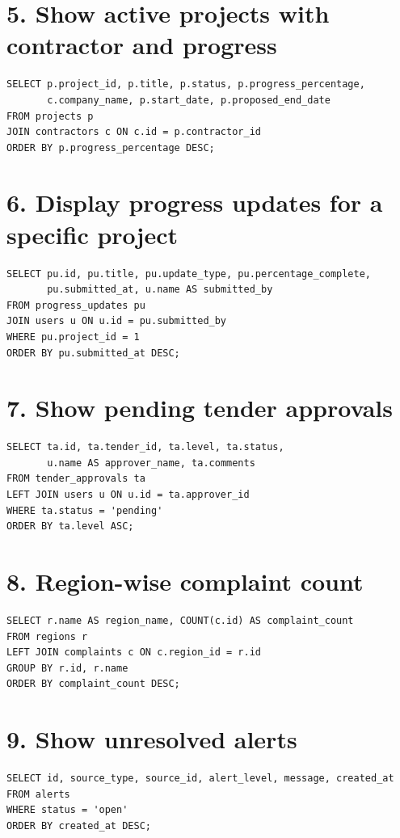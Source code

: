 \documentclass[12pt,a4paper,oneside,openany]{report}
\begin{document}
\section*{5. Show active projects with contractor and progress}
\begin{lstlisting}
SELECT p.project_id, p.title, p.status, p.progress_percentage,
       c.company_name, p.start_date, p.proposed_end_date
FROM projects p
JOIN contractors c ON c.id = p.contractor_id
ORDER BY p.progress_percentage DESC;
\end{lstlisting}

\section*{6. Display progress updates for a specific project}
\begin{lstlisting}
SELECT pu.id, pu.title, pu.update_type, pu.percentage_complete,
       pu.submitted_at, u.name AS submitted_by
FROM progress_updates pu
JOIN users u ON u.id = pu.submitted_by
WHERE pu.project_id = 1
ORDER BY pu.submitted_at DESC;
\end{lstlisting}

\section*{7. Show pending tender approvals}
\begin{lstlisting}
SELECT ta.id, ta.tender_id, ta.level, ta.status,
       u.name AS approver_name, ta.comments
FROM tender_approvals ta
LEFT JOIN users u ON u.id = ta.approver_id
WHERE ta.status = 'pending'
ORDER BY ta.level ASC;
\end{lstlisting}

\section*{8. Region-wise complaint count}
\begin{lstlisting}
SELECT r.name AS region_name, COUNT(c.id) AS complaint_count
FROM regions r
LEFT JOIN complaints c ON c.region_id = r.id
GROUP BY r.id, r.name
ORDER BY complaint_count DESC;
\end{lstlisting}

\section*{9. Show unresolved alerts}
\begin{lstlisting}
SELECT id, source_type, source_id, alert_level, message, created_at
FROM alerts
WHERE status = 'open'
ORDER BY created_at DESC;
\end{lstlisting}
\end{document}
